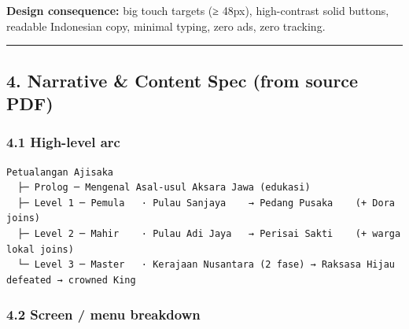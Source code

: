 \documentclass[
  11pt,
]{article}
\begin{document}
\textbf{Design consequence:} big touch targets (≥ 48px), high-contrast
solid buttons, readable Indonesian copy, minimal typing, zero ads, zero
tracking.

\begin{center}\rule{0.5\linewidth}{0.5pt}\end{center}

\subsection{4. Narrative \& Content Spec (from source
PDF)}\label{narrative-content-spec-from-source-pdf}

\subsubsection{4.1 High-level arc}\label{high-level-arc}

\begin{verbatim}
Petualangan Ajisaka
  ├─ Prolog ─ Mengenal Asal-usul Aksara Jawa (edukasi)
  ├─ Level 1 ─ Pemula   · Pulau Sanjaya    → Pedang Pusaka    (+ Dora joins)
  ├─ Level 2 ─ Mahir    · Pulau Adi Jaya   → Perisai Sakti    (+ warga lokal joins)
  └─ Level 3 ─ Master   · Kerajaan Nusantara (2 fase) → Raksasa Hijau defeated → crowned King
\end{verbatim}

\subsubsection{4.2 Screen / menu breakdown}\label{screen-menu-breakdown}
\end{document}
